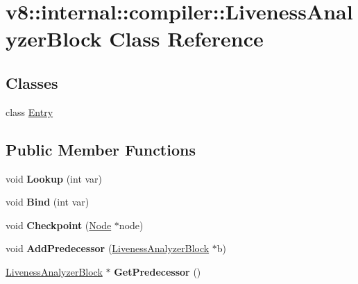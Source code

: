 \hypertarget{classv8_1_1internal_1_1compiler_1_1_liveness_analyzer_block}{}\section{v8\+:\+:internal\+:\+:compiler\+:\+:Liveness\+Analyzer\+Block Class Reference}
\label{classv8_1_1internal_1_1compiler_1_1_liveness_analyzer_block}
\subsection*{Classes}
\begin{DoxyCompactItemize}
\item 
class \hyperlink{classv8_1_1internal_1_1compiler_1_1_liveness_analyzer_block_1_1_entry}{Entry}
\end{DoxyCompactItemize}
\subsection*{Public Member Functions}
\begin{DoxyCompactItemize}
\item 
void {\bfseries Lookup} (int var)\hypertarget{classv8_1_1internal_1_1compiler_1_1_liveness_analyzer_block_a9c6111732d87b00d7ba41eca25cf1012}{}\label{classv8_1_1internal_1_1compiler_1_1_liveness_analyzer_block_a9c6111732d87b00d7ba41eca25cf1012}

\item 
void {\bfseries Bind} (int var)\hypertarget{classv8_1_1internal_1_1compiler_1_1_liveness_analyzer_block_ad5e16ef1c0fb0e98b262415a99e5f6d3}{}\label{classv8_1_1internal_1_1compiler_1_1_liveness_analyzer_block_ad5e16ef1c0fb0e98b262415a99e5f6d3}

\item 
void {\bfseries Checkpoint} (\hyperlink{classv8_1_1internal_1_1compiler_1_1_node}{Node} $\ast$node)\hypertarget{classv8_1_1internal_1_1compiler_1_1_liveness_analyzer_block_a47074b2201405df76abc74c04814a309}{}\label{classv8_1_1internal_1_1compiler_1_1_liveness_analyzer_block_a47074b2201405df76abc74c04814a309}

\item 
void {\bfseries Add\+Predecessor} (\hyperlink{classv8_1_1internal_1_1compiler_1_1_liveness_analyzer_block}{Liveness\+Analyzer\+Block} $\ast$b)\hypertarget{classv8_1_1internal_1_1compiler_1_1_liveness_analyzer_block_a4bf747dcd1f052ab9780a4e32bb893db}{}\label{classv8_1_1internal_1_1compiler_1_1_liveness_analyzer_block_a4bf747dcd1f052ab9780a4e32bb893db}

\item 
\hyperlink{classv8_1_1internal_1_1compiler_1_1_liveness_analyzer_block}{Liveness\+Analyzer\+Block} $\ast$ {\bfseries Get\+Predecessor} ()\hypertarget{classv8_1_1internal_1_1compiler_1_1_liveness_analyzer_block_aa1cd952ca9122e301f6213fc9b8e7de1}{}\label{classv8_1_1internal_1_1compiler_1_1_liveness_analyzer_block_aa1cd952ca9122e301f6213fc9b8e7de1}

\end{DoxyCompactItemize}
